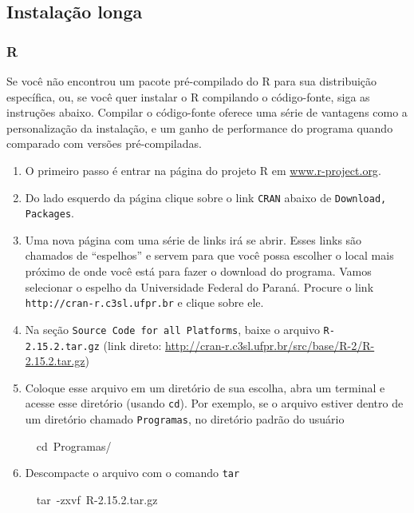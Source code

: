 \documentclass[a4paper,12pt]{article}\usepackage[]{graphicx}\usepackage[]{color}
\makeatletter
\newcommand{\hlnum}[1]{\textcolor[rgb]{0.686,0.059,0.569}{#1}}%
\newcommand{\hlopt}[1]{\textcolor[rgb]{0,0,0}{#1}}%
\newcommand{\hlstd}[1]{\textcolor[rgb]{0.345,0.345,0.345}{#1}}%
\newcommand{\hlkwb}[1]{\textcolor[rgb]{0.69,0.353,0.396}{#1}}%
\newcommand{\hlkwc}[1]{\textcolor[rgb]{0.333,0.667,0.333}{#1}}%
\newenvironment{kframe}{%
 \def\at@end@of@kframe{}%
 \ifinner\ifhmode%
  \def\at@end@of@kframe{\end{minipage}}%
  \begin{minipage}{\columnwidth}%
 \fi\fi%
 \def\FrameCommand##1{\hskip\@totalleftmargin \hskip-\fboxsep
 \colorbox{shadecolor}{##1}\hskip-\fboxsep
     \hskip-\linewidth \hskip-\@totalleftmargin \hskip\columnwidth}%
 \MakeFramed {\advance\hsize-\width
   \@totalleftmargin\z@ \linewidth\hsize
   \@setminipage}}%
 {\par\unskip\endMakeFramed%
 \at@end@of@kframe}
\newenvironment{knitrout}{}{} %
\providecommand{\R}{\textsf{R}\xspace}
\makeatother
\begin{document}
\subsection{Instalação longa}
\label{sec:ill}

\subsubsection{\R}

Se você não encontrou um pacote pré-compilado do \R para sua
distribuição específica, ou, se você quer instalar o \R compilando o
código-fonte, siga as instruções abaixo. Compilar o código-fonte oferece
uma série de vantagens como a personalização da instalação, e um ganho
de performance do programa quando comparado com versões pré-compiladas.

\begin{enumerate}
\item O primeiro passo é entrar na página do projeto \R em
\url{www.r-project.org}.
\item Do lado esquerdo da página clique sobre o link \texttt{CRAN}
  abaixo de \texttt{Download, Packages}.
\item Uma nova página com uma série de links irá se abrir. Esses links
  são chamados de ``espelhos'' e servem para que você possa escolher o
  local mais próximo de onde você está para fazer o download do
  programa. Vamos selecionar o espelho da Universidade Federal do
  Paraná. Procure o link \texttt{http://cran-r.c3sl.ufpr.br} e clique sobre
  ele.
\item Na seção \texttt{Source Code for all Platforms}, baixe o arquivo
  \texttt{R-2.15.2.tar.gz} (link direto:
  \url{http://cran-r.c3sl.ufpr.br/src/base/R-2/R-2.15.2.tar.gz})
\item Coloque esse arquivo em um diretório de sua escolha, abra um
  terminal e acesse esse diretório (usando \texttt{cd}). Por exemplo, se
  o arquivo estiver dentro de um diretório chamado \texttt{Programas},
  no diretório padrão do usuário
\begin{knitrout}\small
{}\color{fgcolor}\begin{kframe}
\noindent
\ttfamily
\hlstd{}\hlstd{\ \ }\hlstd{}\hlkwb{cd\ }\hlstd{Programas}\hlopt{/}\hlstd{}\hspace*{\fill}
\mbox{}
\normalfont
\normalsize
\end{kframe}
\end{knitrout}

\item Descompacte o arquivo com o comando \texttt{tar}
\begin{knitrout}\small
{}\color{fgcolor}\begin{kframe}
\noindent
\ttfamily
\hlstd{}\hlstd{\ \ }\hlstd{}\hlkwc{tar\ }\hlstd{}\hlopt{{-}}\hlstd{zxvf\ R}\hlopt{{-}}\hlstd{}\hlnum{2.15.2}\hlstd{.}\hlkwc{tar}\hlstd{.gz}\hspace*{\fill}
\mbox{}
\normalfont
\normalsize
\end{kframe}
\end{knitrout}


\end{enumerate}
\end{document}
